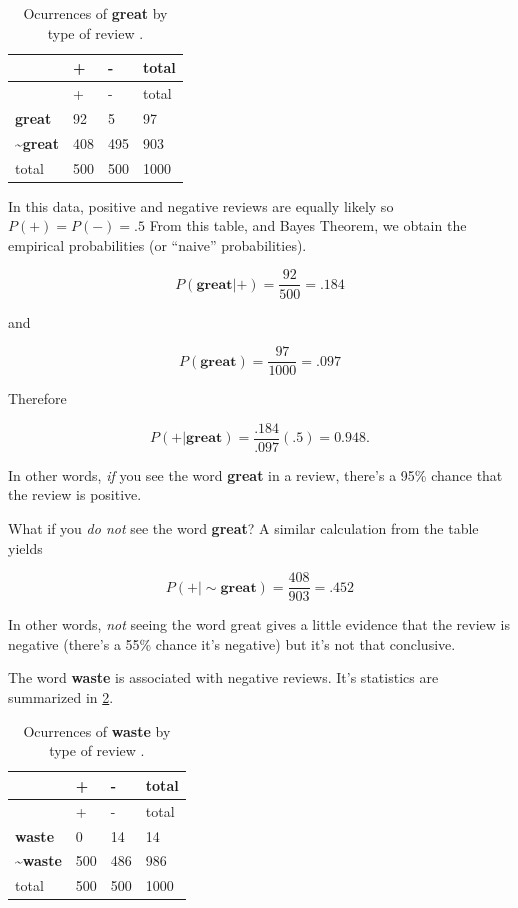 \documentclass[
  oneside]{scrbook}
\begin{document}
\begin{longtable}[]{@{}llll@{}}
\caption{Ocurrences of \textbf{great} by type of review
.\label{tbl:great}}\tabularnewline
\toprule
& + & - & total \\
\midrule
\endfirsthead
\toprule
& + & - & total \\
\midrule
\endhead
\textbf{great} & 92 & 5 & 97 \\
\textasciitilde{}\textbf{great} & 408 & 495 & 903 \\
total & 500 & 500 & 1000 \\
\bottomrule
\end{longtable}

In this data, positive and negative reviews are equally likely so
\(P(+)=P(-)=.5\) From this table, and Bayes Theorem, we obtain the
empirical probabilities (or ``naive'' probabilities).

\[
P(\mathbf{great} | +) = \frac{92}{500} = .184
\]

and

\[
P(\mathbf{great}) = \frac{97}{1000} = .097
\]

Therefore

\[
P(+|\mathbf{great}) = \frac{.184}{.097}(.5) = 0.948.
\]

In other words, \emph{if} you see the word \textbf{great} in a review,
there's a 95\% chance that the review is positive.

What if you \emph{do not} see the word \textbf{great}? A similar
calculation from the table yields

\[
P(+|\sim\mathbf{great}) = \frac{408}{903} = .452
\]

In other words, \emph{not} seeing the word great gives a little evidence
that the review is negative (there's a 55\% chance it's negative) but
it's not that conclusive.

The word \textbf{waste} is associated with negative reviews. It's
statistics are summarized in \cref{tbl:waste}.

\begin{longtable}[]{@{}llll@{}}
\caption{Ocurrences of \textbf{waste} by type of review
.\label{tbl:waste}}\tabularnewline
\toprule
& + & - & total \\
\midrule
\endfirsthead
\toprule
& + & - & total \\
\midrule
\endhead
\textbf{waste} & 0 & 14 & 14 \\
\textasciitilde{}\textbf{waste} & 500 & 486 & 986 \\
total & 500 & 500 & 1000 \\
\bottomrule
\end{longtable}
\end{document}
